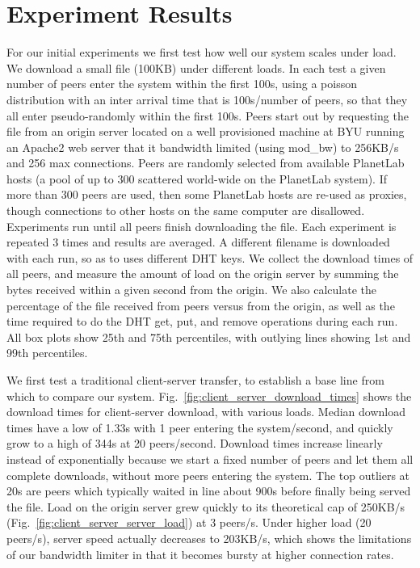
\section{Experiment Results}
For our initial experiments we first test how well our system scales under load. We download a small file (100KB) 
under different loads. In each test a given number of peers enter the system within 
the first 100s, using a poisson distribution with an inter arrival time that is 100s/number of peers, 
so that they all enter pseudo-randomly within the first 100s. Peers start out by requesting the file from 
an origin server located on a well provisioned machine at BYU running an Apache2 web server that it 
bandwidth limited (using mod\_bw) to 256KB/s and 256 max connections. Peers are randomly selected from available PlanetLab 
hosts (a pool of up to 300 scattered world-wide on the PlanetLab system).  If more than 300 peers are used,
then some PlanetLab hosts are re-used as proxies, though connections to other hosts on the same computer
are disallowed.  Experiments run until 
all peers finish downloading the file. Each experiment is repeated 3 times and results are averaged. 
A different filename is downloaded with each run, so as to uses different DHT keys. We collect the download 
times of all peers, and measure the amount of load on the origin server by summing the bytes received within a given 
second from the origin. We also calculate the percentage 
of the file received from peers versus from the origin, as well as the time required to do the DHT 
get, put, and remove operations during each run.  All box plots show 25th and 75th percentiles, with outlying lines showing
1st and 99th percentiles.

We first test a traditional client-server transfer, to establish a base line from which to compare 
our system. Fig.~\ref{fig:client_server_download_times} shows the download times for client-server 
download, with various loads. Median download times have a low of 1.33s with 1 peer entering the system/second, 
and quickly grow to a high of 344s at 20 peers/second. Download times increase linearly instead 
of exponentially because we start a fixed number of peers and let them all complete downloads, without more peers
entering the system. 
The top outliers at 20s are peers which typically waited in line about 900s before finally 
being served the file. Load on the origin server grew quickly to its theoretical cap of 250KB/s (Fig.~\ref{fig:client_server_server_load}) 
at 3 peers/s. Under higher load (20 peers/s), server speed actually decreases to 203KB/s, which 
shows the limitations of our bandwidth limiter in that it becomes bursty at higher connection rates. 

